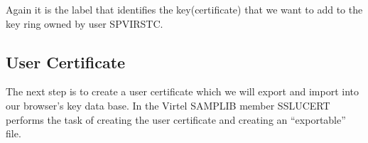 \documentclass[letterpaper,10pt,english]{sphinxmanual}
\begin{document}
Again it is the label that identifies the key(certificate) that we want to add to the key ring owned by user SPVIRSTC.


\subsection{User Certificate}
\label{\detokenize{TN202002:user-certificate}}
The next step is to create a user certificate which we will export and import into our browser’s key data base. In the Virtel SAMPLIB member SSLUCERT performs the task of creating the user certificate and creating an “exportable” file.

\begin{sphinxVerbatim}[commandchars=\\\{\}]
      

\end{sphinxVerbatim}
\end{document}
